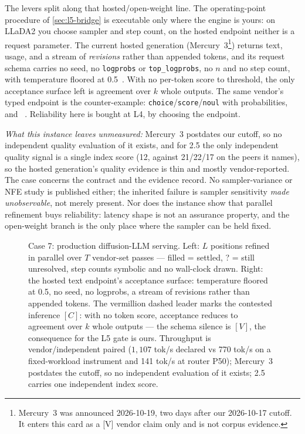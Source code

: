 The levers split along that hosted/open-weight line. The operating-point procedure of \cref{sec:l5-bridge} is
executable only where the engine is yours: on LLaDA2 you choose sampler and step count, on the
hosted endpoint neither is a request parameter. The current hosted generation
(Mercury~3\footnote{Mercury~3 was announced 2026-10-19, two days after our 2026-10-17 cutoff. It
enters this card as a \textsf{[V]} vendor claim only and is not corpus evidence.}) returns text,
usage, and a stream of \emph{revisions} rather than appended tokens, and its request schema
carries no seed, no \texttt{logprobs} or \texttt{top\_logprobs}, no $n$ and no step count, with
temperature floored at 0.5~\cite{inception2026mercury3}. With no per-token score to threshold, the
only acceptance surface left is agreement over $k$ whole outputs. The same vendor's typed endpoint is the
counter-example: \texttt{choice}/\texttt{score}/\texttt{noul} with probabilities, and
~\cite{jevbench2026board}. Reliability here
is bought at L4, by choosing the endpoint.

\emph{What this instance leaves unmeasured:} Mercury~3 postdates our cutoff, so no independent
quality evaluation of it exists, and for 2.5 the only independent quality signal is a single index
score (12, against 21/22/17 on the peers it names), so the hosted generation's quality evidence is
thin and mostly vendor-reported. The case concerns the contract and the evidence record. No sampler-variance
or NFE study is published either; the inherited failure is sampler sensitivity \emph{made
unobservable}, not merely present. Nor does the instance show that parallel refinement buys
reliability: latency shape is not an assurance property, and the open-weight branch is the only
place where the sampler can be held fixed.

\begin{figure}[h!]
  \centering
  \resizebox{\linewidth}{!}{}
  \caption{ Case 7: production diffusion-LLM serving. Left: $L$ positions refined in parallel over $T$ vendor-set passes --- filled = settled, ? = still unresolved, step counts symbolic and no wall-clock drawn. Right: the hosted text endpoint's acceptance surface: temperature floored at 0.5, no seed, no logprobs, a stream of revisions rather than appended tokens. The vermillion dashed leader marks the contested inference $[C]$: with no token score, acceptance reduces to agreement over $k$ whole outputs --- the schema silence is $[V]$, the consequence for the L5 gate is ours. Throughput is vendor/independent paired ($1{,}107$ tok/s declared vs 770 tok/s on a fixed-workload instrument and 141 tok/s at router P50); Mercury~3 postdates the cutoff, so no independent evaluation of it exists; 2.5 carries one independent index score.}
  \label{fig:case-diffusion}
\end{figure}

